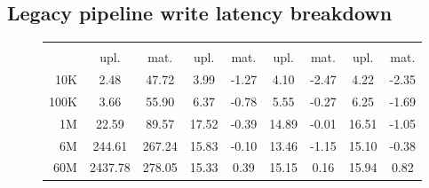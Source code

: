 \subsection{Legacy pipeline write latency breakdown}

\begin{figure}
    \centering
    \begin{minipage}[b]{\textwidth}
        \label{tbl:hudi_virtualiz_breakdown_cpu_perc}
        \begin{tabular}{r S[table-format=4.2] S[table-format=4.2] S[table-format=2.2] S[table-format=2.2] S[table-format=2.2] S[table-format=2.2] S[table-format=2.2] S[table-format=2.2]} 
            \toprule
             &  &  &  & \\
            & {upl.} & {mat.} & {upl.} & {mat.} & {upl.} & {mat.} & {upl.} & {mat.}\\
            \midrule
            10K &  2.48 & 47.72 & 3.99 & -1.27 & 4.10 & -2.47 & 4.22 & -2.35\\
            100K & 3.66 & 55.90 & 6.37 & -0.78 & 5.55 & -0.27 & 6.25 & -1.69\\
            1M   & 22.59 & 89.57 & 17.52 & -0.39 & 14.89 & -0.01 & 16.51 & -1.05\\
            6M   & 244.61 & 267.24 & 15.83 & -0.10 & 13.46 & -1.15 & 15.10 & -0.38\\
            60M &  2437.78 & 278.05 & 15.33 & 0.39 & 15.15 & 0.16 & 15.94 & 0.82\\
            \bottomrule
        \end{tabular}
    \end{minipage}
    \begin{minipage}[b]{\textwidth}

\end{minipage}
\end{figure}

